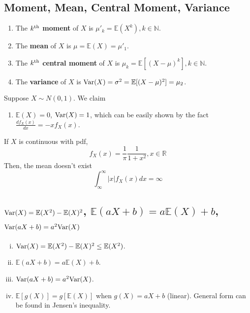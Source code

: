 \documentclass[11pt]{elegantbook}
\begin{document}
\subsection{Moment, Mean, Central Moment, Variance}
\begin{definition}
    \normalfont
    \begin{enumerate}
        \item The \textbf{$k^\textnormal{th}$ moment} of $X$ is $\mu'_k=\mathbb{E}(X^k), k\in \mathbb{N}$.
        \item The \textbf{mean} of $X$ is $\mu=\mathbb{E}(X)=\mu'_1$.
        \item The \textbf{$k^\textnormal{th}$ central moment} of $X$ is $\mu_k=\mathbb{E}[(X-\mu)^k], k\in \mathbb{N}$.
        \item The \textbf{variance} of $X$ is $\textnormal{Var}(X)=\sigma^2=\mathbb{E}[(X-\mu)^2]=\mu_2$.
    \end{enumerate}
\end{definition}
\begin{example}[ $N(0,1)$]
    Suppose $X\sim N(0,1)$. We claim
    \begin{enumerate}[$\circ$]
        \item $\mathbb{E}(X)=0$, $\textnormal{Var}(X)=1$, which can be easily shown by the fact $\frac{d f_X(x)}{d x}=-xf_X(x)$.
    \end{enumerate}
\end{example}

\begin{example}[ Cauchy]
    If $X$ is continuous with pdf, $$f_X(x)=\frac{1}{\pi}\frac{1}{1+x^2}, x\in \mathbb{R}$$
    Then, the mean doesn't exist $$\int_\infty^\infty |x|f_X(x)dx=\infty$$
\end{example}

\subsection{$\textnormal{Var}(X)=\mathbb{E}(X^2)-\mathbb{E}(X)^2$, $\mathbb{E}(aX+b)=a \mathbb{E}(X)+b$, $\textnormal{Var}(aX+b)=a^2 \textnormal{Var}(X)$}
\begin{proposition}
    \begin{enumerate}[(i).]
        \item $\textnormal{Var}(X)=\mathbb{E}(X^2)-\mathbb{E}(X)^2\leq \mathbb{E}(X^2)$.
        \item $\mathbb{E}(aX+b)=a \mathbb{E}(X)+b$.
        \item $\textnormal{Var}(aX+b)=a^2 \textnormal{Var}(X)$.
        \item $\mathbb{E}[g(X)]=g[\mathbb{E}(X)]$ when $g(X)=aX+b$ (linear). General form can be found in Jensen's inequality.
    \end{enumerate}
\end{proposition}
\end{document}
